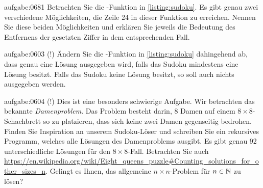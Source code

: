 \begin{aufgabe}{aufgabe:0681}
Betrachten Sie die -Funktion in \cref{listing:sudoku}. Es gibt genau zwei verschiedene Möglichkeiten, die Zeile 24 in dieser Funktion zu erreichen. Nennen Sie diese beiden Möglichkeiten und erklären Sie jeweils die Bedeutung des Entfernens der gesetzten Ziffer in dem entsprechenden Fall.
\end{aufgabe}

\begin{aufgabe}{aufgabe:0603}
(!) Ändern Sie die -Funktion in \cref{listing:sudoku} dahingehend ab, dass genau eine Lösung ausgegeben wird, falls das Sudoku mindestens eine Lösung besitzt. Falls das Sudoku keine Lösung besitzt, so soll auch nichts ausgegeben werden.
\end{aufgabe}

\begin{aufgabe}{aufgabe:0604}
(!) Dies ist eine besonders schwierige Aufgabe. Wir betrachten das bekannte \textit{Damenproblem}. Das Problem besteht darin, 8 Damen auf einem $8\times 8$-Schachbrett so zu platzieren, dass sich keine zwei Damen gegenseitig bedrohen. Finden Sie Inspiration an unserem Sudoku-Löser und schreiben Sie ein rekursives Programm, welches alle Lösungen des Damenproblems ausgibt. Es gibt genau 92 unterschiedliche Lösungen für den $8\times 8$-Fall. Betrachten Sie auch \url{https://en.wikipedia.org/wiki/Eight\_queens\_puzzle#Counting\_solutions\_for\_other\_sizes\_n}. Gelingt es Ihnen, das allgemeine $n\times n$-Problem für $n\in\mathbb{N}$ zu lösen?
\end{aufgabe}


